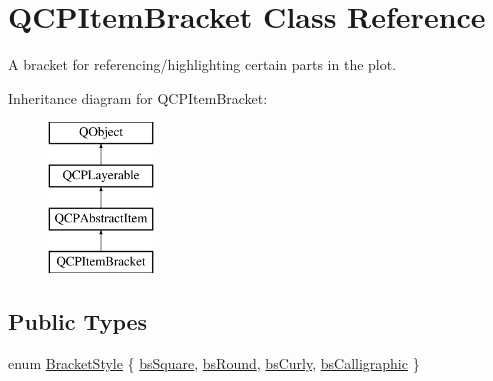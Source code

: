 \hypertarget{class_q_c_p_item_bracket}{}\section{Q\+C\+P\+Item\+Bracket Class Reference}
\label{class_q_c_p_item_bracket}


A bracket for referencing/highlighting certain parts in the plot.  


Inheritance diagram for Q\+C\+P\+Item\+Bracket\+:\begin{figure}[H]
\begin{center}
\leavevmode
\includegraphics[height=4.000000cm]{class_q_c_p_item_bracket}
\end{center}
\end{figure}
\subsection*{Public Types}
\begin{DoxyCompactItemize}
\item 
enum \mbox{\hyperlink{class_q_c_p_item_bracket_a7ac3afd0b24a607054e7212047d59dbd}{Bracket\+Style}} \{ \mbox{\hyperlink{class_q_c_p_item_bracket_a7ac3afd0b24a607054e7212047d59dbda7f9df4a7359bfe3dac1dbe4ccf5d220c}{bs\+Square}}, 
\mbox{\hyperlink{class_q_c_p_item_bracket_a7ac3afd0b24a607054e7212047d59dbda394627b0830a26ee3e0a02ca67a9f918}{bs\+Round}}, 
\mbox{\hyperlink{class_q_c_p_item_bracket_a7ac3afd0b24a607054e7212047d59dbda5024ce4023c2d8de4221f1cd4816acd8}{bs\+Curly}}, 
\mbox{\hyperlink{class_q_c_p_item_bracket_a7ac3afd0b24a607054e7212047d59dbda8f29f5ef754e2dc9a9efdedb2face0f3}{bs\+Calligraphic}}
 \}
\end{DoxyCompactItemize}

